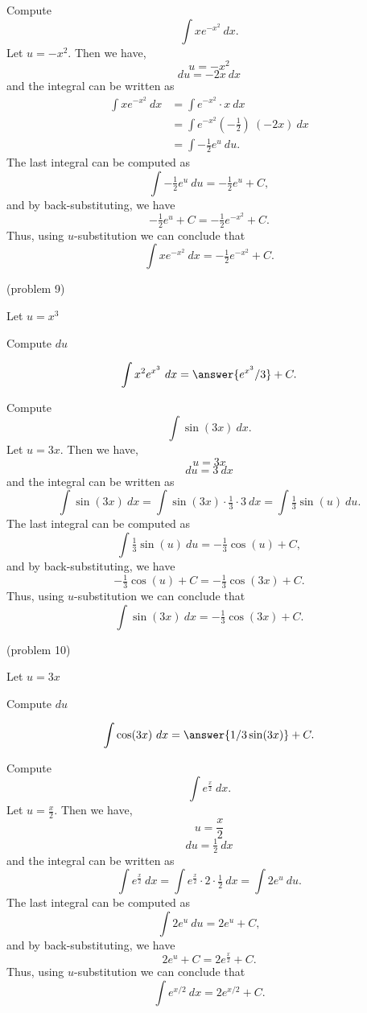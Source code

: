 \documentclass{ximera}
\begin{document}
\begin{example}[example 9] Compute 
\[\int xe^{-x^2} \ dx.\]
Let $u = -x^2 $.  Then we have,
\[u = -x^2\]
\[du = -2x \ dx\]
and the integral can be written as
\begin{align*}
\int xe^{-x^2} \ dx &= \int e^{-x^2} \cdot x\  dx \\
&=  \int e^{-x^2}( -\tfrac12)\ (-2x)\  dx \\
&=  \int -\tfrac12 e^u \ du.
\end{align*}
The last integral can be computed as 
\[ \int -\tfrac12 e^u \ du = -\tfrac12 e^u + C,\]
and by back-substituting, we have 
\[-\tfrac12 e^u + C = -\tfrac12 e^{-x^2} + C.\]
Thus, using $u$-substitution we can conclude that
\[\int xe^{-x^2} \ dx =  -\tfrac12 e^{-x^2} + C.\]
\end{example}


\begin{problem}(problem 9)
\begin{hint}
Let $u = x^3$
\end{hint}
\begin{hint}
Compute $du$
\end{hint}
\[\int x^2e^{x^3} \ dx = \answer{e^{x^3}/3} +C.\]
\end{problem}




\begin{example}[example 10] Compute 
\[\int \sin(3x) \ dx.\]
Let $u = 3x$.  Then we have,
\[u = 3x\]
\[du = 3 \ dx\]
and the integral can be written as 
\[\int\sin(3x) \ dx =  \int \sin(3x) \cdot \tfrac13\cdot 3 \   dx =   \int \tfrac13 \sin(u) \ du.\]
The last integral can be computed as 
\[ \int \tfrac13 \sin(u) \ du = -\tfrac13 \cos(u) + C,\]
and by back-substituting, we have 
\[-\tfrac13 \cos(u) + C = -\tfrac13 \cos(3x) + C.\]
Thus, using $u$-substitution we can conclude that
\[\int \sin(3x) \ dx =  -\tfrac13 \cos(3x) + C.\]
\end{example}

\begin{problem}(problem 10)
\begin{hint}
Let $u = 3x$
\end{hint}
\begin{hint}
Compute $du$
\end{hint}
\[\int \cos(3x) \ dx = \answer{1/3 \sin(3x)} +C.\]
\end{problem}






\begin{example}[example 11] Compute 
\[\int e^{\frac{x}{2}} \ dx.\]
Let $u = \frac{x}{2}$.  Then we have,
\[u = \frac{x}{2}\]
\[du = \tfrac12 \ dx\]
and the integral can be written as 
\[\int e^{\frac{x}{2}} \ dx =  \int e^{\frac{x}{2}} \cdot 2\cdot \tfrac{1}{2}  \   dx =   \int 2e^u \ du.\]
The last integral can be computed as 
\[\int 2e^u \ du = 2 e^u + C,\]
and by back-substituting, we have 
\[2e^u + C = 2e^{\frac{x}{2}}+ C.\]
Thus, using $u$-substitution we can conclude that
\[\int e^{x/2} \ dx = 2e^{x/2} + C.\]
\end{example}
\end{document}
